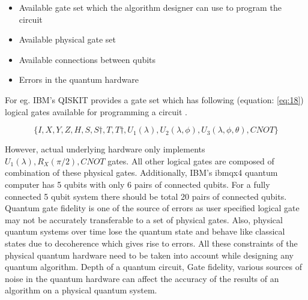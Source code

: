 \documentclass[english,a4paper,11pt,oneside,onecolumn]{book}
\begin{document}
\begin{itemize}
    \item Available gate set which the algorithm designer can use to program the circuit
    \item Available physical gate set
    \item Available connections between qubits
    \item Errors in the quantum hardware
\end{itemize}

For eg. IBM's QISKIT provides a gate set which has following (equation: \ref{eq:18}) logical gates available for programming a circuit \cite{j_2020_quantum}.

\begin{equation}\label{eq:18}
    \{I, X, Y, Z, H, S, S\dagger, T, T\dagger, U_1(\lambda), U_2(\lambda, \phi), U_3(\lambda, \phi, \theta), CNOT\}
\end{equation}

However, actual underlying hardware only implements ${U_1(\lambda), R_X(\pi/2), CNOT}$ gates. All other logical gates are composed of combination of these physical gates. Additionally, IBM's ibmqx4 quantum computer has 5 qubits with only 6 pairs of connected qubits. For a fully connected 5 qubit system there should be total 20 pairs of connected qubits. Quantum gate fidelity is one of the source of errors as user specified logical gate may not be accurately transferable to a set of physical gates. Also, physical quantum systems over time lose the quantum state and behave like classical states due to decoherence which gives rise to errors. All these constraints of the physical quantum hardware need to be taken into account while designing any quantum algorithm. Depth of a quantum circuit, Gate fidelity, various sources of noise in the quantum hardware can affect the accuracy of the results of an algorithm on a physical quantum system.
\end{document}
